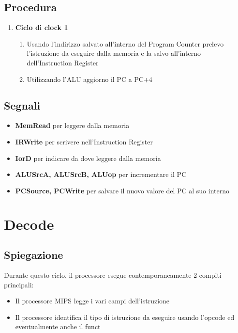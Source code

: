 \subsection{Procedura}
\begin{enumerate}
    \item \textbf{Ciclo di clock 1}
        \begin{enumerate}[label=\theenumi.\arabic*]
            \item Usando l'indirizzo salvato all'interno del Program Counter prelevo l'istruzione da eseguire dalla memoria e la salvo all'interno dell'Instruction Register
            \item Utilizzando l'ALU aggiorno il PC a PC+4
        \end{enumerate}
\end{enumerate}

\subsection{Segnali}
\begin{itemize}
    \item \textbf{MemRead} per leggere dalla memoria
    \item \textbf{IRWrite} per scrivere nell'Instruction Register
    \item \textbf{IorD} per indicare da dove leggere dalla memoria
    \item \textbf{ALUSrcA, ALUSrcB, ALUop} per incrementare il PC
    \item \textbf{PCSource, PCWrite} per salvare il nuovo valore del PC al suo interno
\end{itemize}

\newpage

\section{Decode}
\subsection{Spiegazione}
Durante questo ciclo, il processore esegue contemporaneamente 2 compiti principali:
\begin{itemize}
    \item Il processore MIPS legge i vari campi dell'istruzione
    \item Il processore identifica il tipo di istruzione da eseguire usando l'opcode ed eventualmente anche il funct
\end{itemize}

